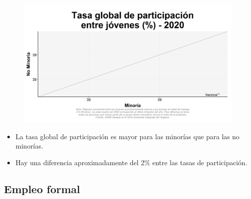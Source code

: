     \begin{figure}[H]
        \caption[Tasa global de participación entre jóvenes por minorías y no minorías para 2020 ]{\label{particjov_minoria_scatter} }
        \begin{center}
        \includegraphics[width=\textwidth,keepaspectratio]{img/var_84_scatter.png}
        \end{center}
    \end{figure}
            \begin{itemize}
                \item La tasa global de participación es mayor para las minorías que para las no minorías.
                \item Hay una diferencia aproximadamente del 2\% entre las tasas de participación.
                \end{itemize}

    \subsection{Empleo formal}

